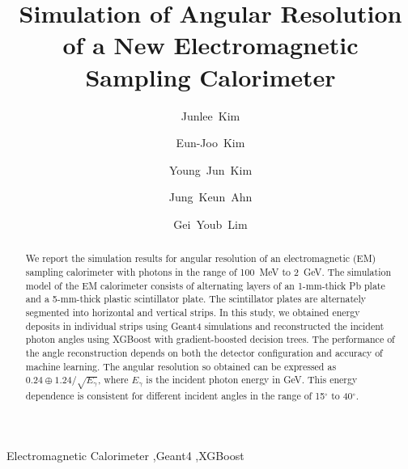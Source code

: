 \documentclass[preprint,12pt,times,a4paper]{elsarticle}
\begin{document}
\begin{frontmatter}

\setcounter{page}{0}
\title{Simulation of Angular Resolution of a New Electromagnetic Sampling Calorimeter}

\author[jbnu]{Junlee~Kim}

\author[jbnu]{Eun-Joo~Kim}

\author[korea]{Young~Jun~Kim}
\author[korea]{Jung~Keun~Ahn}
\author[kek]{Gei~Youb~Lim}

\address[jbnu]{Division of Science Education, Jeonbuk National University, Jeonju 54896, Korea}
\address[korea]{Department of Physics, Korea University, Seoul 02841, Korea}
\address[kek]{Institute of Particle and Nuclear Studies (IPNS), High Energy Accelerator Research Organization (KEK), Tsukuba 305-0801, Japan}


\begin{abstract}
We report the simulation results for angular resolution of an electromagnetic (EM) sampling calorimeter with photons in the range of 100~MeV to 2~GeV. The simulation model of the EM calorimeter consists of alternating layers of an 1-mm-thick Pb plate and a 5-mm-thick plastic scintillator plate. The scintillator plates are alternately segmented into horizontal and vertical strips. In this study, we obtained energy deposits in individual strips using Geant4 simulations and reconstructed the incident photon angles using XGBoost with gradient-boosted decision trees. The performance of the angle reconstruction depends on both the detector configuration and accuracy of machine learning. The angular resolution so obtained can be expressed as $0.24 \oplus 1.24/\sqrt{E_{\gamma}}$, where $E_{\gamma}$ is the incident photon energy in GeV. This energy dependence is consistent for different incident angles 
in the range of 15$^{\circ}$ to 40$^{\circ}$.

\end{abstract}
\begin{keyword}
Electromagnetic Calorimeter \sep Geant4 \sep XGBoost
\end{keyword}

\end{frontmatter}
\end{document}
